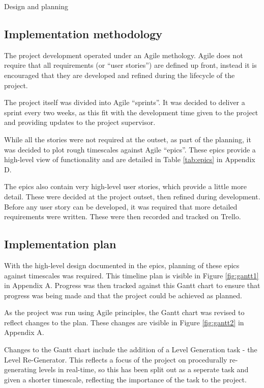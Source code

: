 \documentclass[progress]{cmpreport}
\begin{document}
\begin{section}{Design and planning}

\subsection{Implementation methodology}
The project development operated under an Agile methology. Agile does not require that all requirements (or ``user stories'') are defined up front, instead it is encouraged that they are developed and refined during the lifecycle of the project.

The project itself was divided into Agile ``sprints''. It was decided to deliver a sprint every two weeks, as this fit with the development time given to the project and providing updates to the project supervisor.

While all the stories were not required at the outset, as part of the planning, it was decided to plot rough timescales against Agile ``epics''. These epics provide a high-level view of functionality and are detailed in Table \ref{tab:epics} in Appendix D.

The epics also contain very high-level user stories, which provide a little more detail. These were decided at the project outset, then refined during development. Before any user story can be developed, it was required that more detailed requirements were written. These were then recorded and tracked on Trello. 

\subsection{Implementation plan}

With the high-level design documented in the epics, planning of these epics against timescales was required. This timeline plan is visible in Figure \ref{fig:gantt1} in Appendix A. Progress was then tracked against this Gantt chart to ensure that progress was being made and that the project could be achieved as planned.

As the project was run using Agile principles, the Gantt chart was revised to reflect changes to the plan. These changes are visible in Figure \ref{fig:gantt2} in Appendix A. 

Changes to the Gantt chart include the addition of a Level Generation task - the Level Re-Generator. This reflects a focus of the project on procedurally re-generating levels in real-time, so this has been split out as a seperate task and given a shorter timescale, reflecting the importance of the task to the project.


\end{section}
\end{document}
